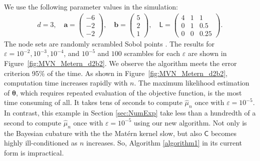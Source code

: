 \documentclass[twocolumn]{svjour3}          %
\newcommand{\bm}[1]{\boldsymbol{#1}}
\newcommand{\vtheta}{{\bm{\theta}}}
\newcommand{\va}{\bm{a}}
\newcommand{\vb}{\bm{b}}
\newcommand{\mC}{\mathsf{C}}
\newcommand{\mL}{\mathsf{L}}
\newcommand{\hmu}{\widehat{\mu}}
\newcommand\figref{Figure~\ref}
\newcommand{\FJHNote}[1]{{\textcolor{blue}{FJH: #1}}}
\newcommand{\JRNote}[1]{{\textcolor{green}{JR: #1}}}
\begin{document}
We use the following parameter values in the simulation: 
\begin{align*}
d = 3, \quad \va = \begin{pmatrix}
-6 \\ -2 \\ -2
\end{pmatrix}, \quad 
\vb = \begin{pmatrix}
5 \\ 2 \\ 1
\end{pmatrix} , \quad 
\mL = \begin{pmatrix}
4 & 1 & 1 \\ 0 & 1 & 0.5 \\ 0 & 0 & 0.25
\end{pmatrix}.
\end{align*}
The node sets are randomly scrambled Sobol points \cite{DicEtal14a,DicPil10a}.  The results for  $\varepsilon = 10^{-2}, 10^{-3}, 10^{-4}$, and $10^{-5}$ and $100$ scrambles for each $\varepsilon$ are shown in \figref{fig:MVN_Metern_d2b2}.  We  observe the algorithm meets the error criterion 95\% of the time.
As shown in \figref{fig:MVN_Metern_d2b2}, computation time increases rapidly with $n$. 
The  maximum likelihood estimation of $\vtheta$, which requires repeated evaluation of the objective function, is the most time consuming of all. It takes tens of seconds to compute $\hmu_n$ once with $\varepsilon = 10^{-5}$.   In contrast, this example in Section \ref{sec:NumExp} take less than a hundredth of a second to compute $\hmu_n$ once with $\varepsilon = 10^{-5}$ using our new algorithm. Not only is the Bayesian cubature with the the Mat\'ern kernel slow, but also $\mC$ becomes highly ill-conditioned as $n$ increases.
So, Algorithm \ref{algorithm1}  in its current form is impractical. 
\end{document}

